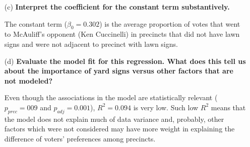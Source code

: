 \documentclass[12pt,letterpaper]{article}
\begin{document}
\begin{enumerate}
	\item [(c)]
	\textbf{Interpret the coefficient for the constant term substantively.}
	
	The constant term ($\beta_0 = 0.302$) is the average proportion of votes that went to McAuliff's opponent (Ken Cuccinelli) in precincts that did not have lawn signs and were not adjacent to precinct with lawn signs.
	
	\item [(d)]
	\textbf{Evaluate the model fit for this regression.  What does this	tell us about the importance of yard signs versus other factors that are not modeled?}
	
	Even though the associations in the model are statistically relevant ($p_{prec} = 009$ and $p_{adj} = 0.001$), $R^2 = 0.094$ is very low. Such low $R^2$ means that the model does not explain much of data variance and, probably, other factors which were not considered may have more weight in explaining the difference of voters' preferences among precincts.
	
\end{enumerate}
\end{document}
